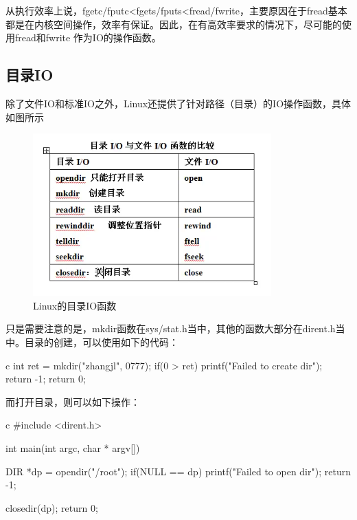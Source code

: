 从执行效率上说，fgetc/fputc<fgets/fputs<fread/fwrite，主要原因在于fread基本都是在内核空间操作，效率有保证。因此，在有高效率要求的情况下，尽可能的使用fread和fwrite
作为IO的操作函数。

\subsection{目录IO}
除了文件IO和标准IO之外，Linux还提供了针对路径（目录）的IO操作函数，具体如图所示
\begin{figure}[H]
  \centering
  \includegraphics[width=\linewidth]{dirio.png}
  \caption{Linux的目录IO函数}
  \label{fig:dirio}
\end{figure}

只是需要注意的是，mkdir函数在sys/stat.h当中，其他的函数大部分在dirent.h当中。目录的创建，可以使用如下的代码：
\begin{code-block}{c}
int ret = mkdir("zhangjl", 0777);
if(0 > ret)
{
        printf("Failed to create dir\n");
        return -1;
}
return 0;
\end{code-block}

而打开目录，则可以如下操作：
\begin{code-block}{c}
#include <dirent.h>

int main(int argc, char * argv[])
{
        DIR *dp = opendir("/root");
        if(NULL ==  dp)
        {
                printf("Failed to open dir\n");
                return -1;
        }

        closedir(dp);
        return 0;
}
\end{code-block}

